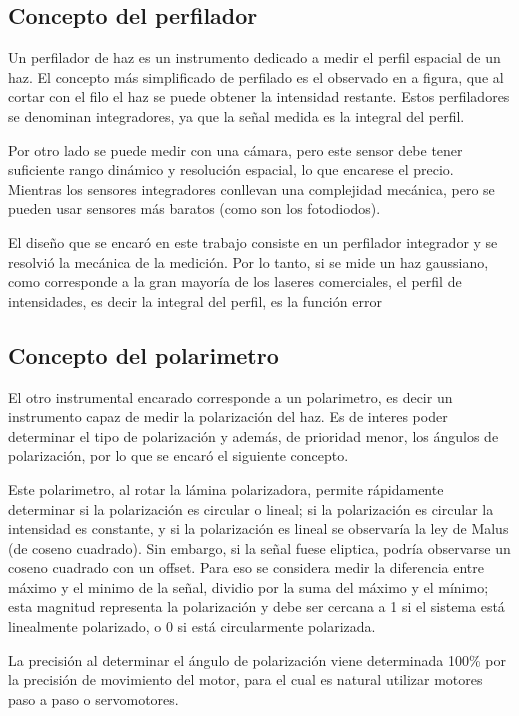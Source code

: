 
\subsection{Concepto del perfilador}

Un perfilador de haz es un instrumento dedicado a medir el perfil espacial de un haz. El concepto más simplificado de perfilado es el observado en a figura, que al cortar con el filo el haz se puede obtener la intensidad restante. Estos perfiladores se denominan integradores, ya que la señal medida es la integral del perfil. 

Por otro lado se puede medir con una cámara, pero este sensor debe tener suficiente rango dinámico y resolución espacial, lo que encarese el precio. Mientras los sensores integradores conllevan una complejidad mecánica, pero se pueden usar sensores más baratos (como son los fotodiodos).

El diseño que se encaró en este trabajo consiste en un perfilador integrador y se resolvió la mecánica de la medición. Por lo tanto, si se mide un haz gaussiano, como corresponde a la gran mayoría de los laseres comerciales, el perfil de intensidades, es decir la integral del perfil, es la función error


\subsection{Concepto del polarimetro}

El otro instrumental encarado corresponde a un polarimetro, es decir un instrumento capaz de medir la polarización del haz. Es de interes poder determinar el tipo de polarización y además, de prioridad menor, los ángulos de polarización, por lo que se encaró el siguiente concepto.

Este polarimetro, al rotar la lámina polarizadora, permite rápidamente determinar si la polarización es circular o lineal; si la polarización es circular la intensidad es constante, y si la polarización es lineal se observaría la ley de Malus (de coseno cuadrado). Sin embargo, si la señal fuese eliptica, podría observarse un coseno cuadrado con un offset. Para eso se considera medir la diferencia entre máximo y el minimo de la señal, dividio por la suma del máximo y el mínimo; esta magnitud representa la polarización y debe ser cercana a 1 si el sistema está linealmente polarizado, o 0 si está circularmente polarizada.

La precisión al determinar el ángulo de polarización viene determinada 100\% por la precisión de movimiento del motor, para el cual es natural utilizar motores paso a paso o servomotores.

